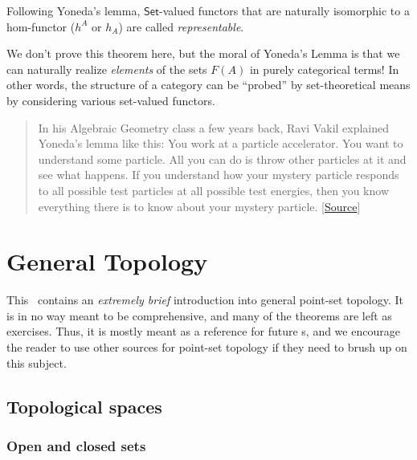 \begin{defn}
    Following Yoneda's lemma, $\mathsf{Set}$-valued functors that are naturally isomorphic to a hom-functor ($h^A$ or $h_A$) are called \emph{representable}.
\end{defn}
\begin{rem}
    We don't prove this theorem here, but the moral of Yoneda's Lemma
    is that we can naturally realize \emph{elements} of the sets
    $F(A)$ in purely categorical terms! In other words, the structure of a category can be ``probed'' by set-theoretical means by considering various set-valued functors.

    \begin{quote}
        \small In his Algebraic Geometry class a few years back, Ravi Vakil
        explained Yoneda's lemma like this: You work at a particle accelerator.
        You want to understand some particle. All you can do is throw other
        particles at it and see what happens. If you understand how your mystery
        particle responds to all possible test particles at all possible test
        energies, then you know everything there is to know about your mystery
        particle. {[}\href{https://mathoverflow.net/a/3223/22773}{Source}{]}
    \end{quote}
\end{rem}






\clearpage
\chapter{General Topology}\label{ch: general topology}

This \chap\ contains an \emph{extremely brief} introduction into general point-set topology. It is in no way meant to be comprehensive, and many of the theorems are left as exercises. Thus, it is mostly meant as a reference for future \chap s, and we encourage the reader to use other sources for point-set topology if they need to brush up on this subject.


\section{Topological spaces}

\subsection{Open and closed sets}

